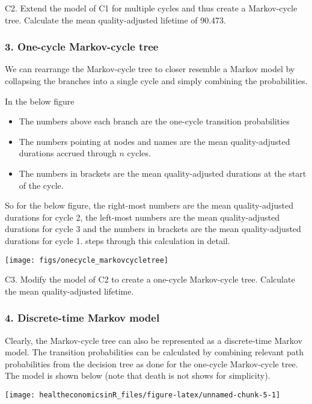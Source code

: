 \documentclass[]{book}
\providecommand{\tightlist}{%
  \setlength{\itemsep}{0pt}\setlength{\parskip}{0pt}}
\begin{document}
C2. Extend the model of C1 for multiple cycles and thus create a Markov-cycle tree. Calculate the mean quality-adjusted lifetime of 90.473.

\hypertarget{C3}{%
\subsubsection{3. One-cycle Markov-cycle tree}\label{C3}}

We can rearrange the Markov-cycle tree to closer resemble a Markov model by collapsing the branches into a single cycle and simply combining the probabilities.

In the below figure

\begin{itemize}
\tightlist
\item
  The numbers above each branch are the one-cycle transition probabilities
\item
  The numbers pointing at nodes and names are the mean quality-adjusted durations accrued through \(n\) cycles.
\item
  The numbers in brackets are the mean quality-adjusted durations at the start of the cycle.
\end{itemize}

So for the below figure, the right-most numbers are the mean quality-adjusted durations for cycle 2, the left-most numbers are the mean quality-adjusted durations for cycle 3 and the numbers in brackets are the mean quality-adjusted durations for cycle 1.
\citet{Hazen2014} steps through this calculation in detail.

\texttt{[image: figs/onecycle\_markovcycletree]}

C3. Modify the model of C2 to create a one-cycle Markov-cycle tree. Calculate the mean quality-adjusted lifetime.

\hypertarget{C4}{%
\subsubsection{4. Discrete-time Markov model}\label{C4}}

Clearly, the Markov-cycle tree can also be represented as a discrete-time Markov model.
The transition probabilities can be calculated by combining relevant path probabilities from the decision tree as done for the one-cycle Markov-cycle tree.
The model is shown below (note that death is not shows for simplicity).

\texttt{[image: healtheconomicsinR\_files/figure-latex/unnamed-chunk-5-1]}
\end{document}
